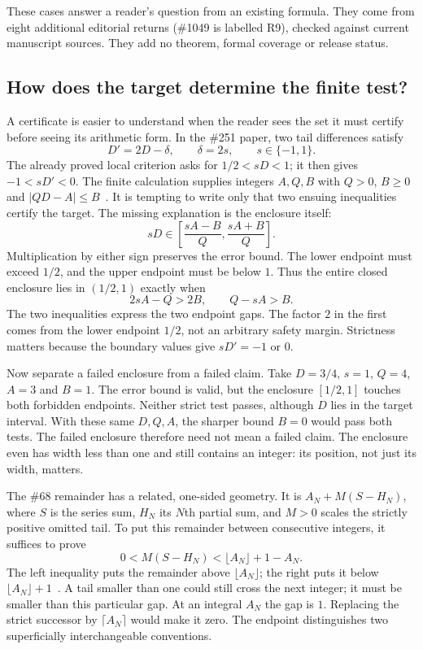 These cases answer a reader's question from an existing formula. They come
from eight additional editorial returns (\#1049 is labelled R9), checked
against current manuscript sources. They add no theorem, formal coverage
or release status.

\subsection{How does the target determine the finite test?}\label{sec:certificate}

A certificate is easier to understand when the reader sees the set it must
certify before seeing its arithmetic form. In the \#251 paper, two tail
differences satisfy
\[
 D'=2D-\delta,\qquad \delta=2s,\qquad s\in\{-1,1\}.
\]
The already proved local criterion asks for $1/2<sD<1$; it then gives
$-1<sD'<0$. The finite calculation supplies integers $A,Q,B$ with $Q>0$,
$B\ge0$ and $|QD-A|\le B$~\cite[section on finite separation]{paper251}.
It is tempting to write only that two ensuing inequalities certify the target.
The missing explanation is the enclosure itself:
\[
 sD\in\left[\frac{sA-B}{Q},\frac{sA+B}{Q}\right].
\]
Multiplication by either sign preserves the error bound. The lower endpoint
must exceed $1/2$, and the upper endpoint must be below $1$. Thus the entire
closed enclosure lies in $(1/2,1)$ exactly when
\[
             2sA-Q>2B,\qquad Q-sA>B.
\]
The two inequalities express the two endpoint gaps. The factor $2$ in the
first comes from the lower endpoint $1/2$, not an arbitrary safety margin.
Strictness matters because the boundary values give $sD'=-1$ or $0$.

Now separate a failed enclosure from a failed claim. Take $D=3/4$, $s=1$,
$Q=4$, $A=3$ and $B=1$. The error bound is valid, but the enclosure
$[1/2,1]$ touches both forbidden endpoints. Neither strict test passes,
although $D$ lies in the target interval. With these same $D,Q,A$, the sharper
bound $B=0$ would pass both tests. The failed enclosure therefore need not
mean a failed claim. The enclosure even has width less than one and still
contains an integer: its position, not just its width, matters.

The \#68 remainder has a related, one-sided geometry. It is
$A_N+M(S-H_N)$, where $S$ is the series sum, $H_N$ its $N$th partial sum,
and $M>0$ scales the strictly positive omitted tail. To put this remainder
between consecutive integers, it suffices to prove
\[
             0<M(S-H_N)<\lfloor A_N\rfloor+1-A_N.
\]
The left inequality puts the remainder above $\lfloor A_N\rfloor$; the right
puts it below $\lfloor A_N\rfloor+1$~\cite[section on nonintegrality]{paper68}.
A tail smaller than one could still cross the next integer; it must be
smaller than this particular gap. At an integral $A_N$ the gap is $1$. Replacing the strict successor by
$\lceil A_N\rceil$ would make it zero. The endpoint distinguishes two
superficially interchangeable conventions.

